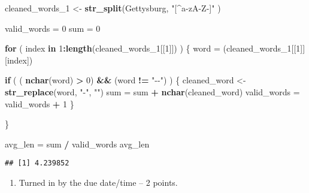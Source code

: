 \documentclass[
]{article}
\newenvironment{Shaded}{\begin{snugshade}}{\end{snugshade}}
\newcommand{\ControlFlowTok}[1]{\textcolor[rgb]{0.13,0.29,0.53}{\textbf{#1}}}
\newcommand{\DecValTok}[1]{\textcolor[rgb]{0.00,0.00,0.81}{#1}}
\newcommand{\FunctionTok}[1]{\textcolor[rgb]{0.13,0.29,0.53}{\textbf{#1}}}
\newcommand{\NormalTok}[1]{#1}
\newcommand{\OtherTok}[1]{\textcolor[rgb]{0.56,0.35,0.01}{#1}}
\newcommand{\SpecialCharTok}[1]{\textcolor[rgb]{0.81,0.36,0.00}{\textbf{#1}}}
\newcommand{\StringTok}[1]{\textcolor[rgb]{0.31,0.60,0.02}{#1}}
\providecommand{\tightlist}{%
  \setlength{\itemsep}{0pt}\setlength{\parskip}{0pt}}
\begin{document}
\begin{Shaded}
\begin{Highlighting}[]
\NormalTok{cleaned\_words\_1 }\OtherTok{\textless{}{-}} \FunctionTok{str\_split}\NormalTok{(Gettysburg, }\StringTok{"[\^{}a{-}zA{-}Z{-}]"}\NormalTok{   )}

\NormalTok{valid\_words }\OtherTok{=} \DecValTok{0}
\NormalTok{sum }\OtherTok{=} \DecValTok{0}

\ControlFlowTok{for}\NormalTok{ ( index }\ControlFlowTok{in} \DecValTok{1}\SpecialCharTok{:}\FunctionTok{length}\NormalTok{(cleaned\_words\_1[[}\DecValTok{1}\NormalTok{]]) )}
\NormalTok{\{}
\NormalTok{  word }\OtherTok{=}\NormalTok{ (cleaned\_words\_1[[}\DecValTok{1}\NormalTok{]][index])}
  
  \ControlFlowTok{if}\NormalTok{ ( ( }\FunctionTok{nchar}\NormalTok{(word) }\SpecialCharTok{\textgreater{}} \DecValTok{0}\NormalTok{) }\SpecialCharTok{\&\&}\NormalTok{ (word }\SpecialCharTok{!=} \StringTok{"{-}{-}"}\NormalTok{) )}
\NormalTok{  \{}
\NormalTok{    cleaned\_word }\OtherTok{\textless{}{-}} \FunctionTok{str\_replace}\NormalTok{(word, }\StringTok{"{-}"}\NormalTok{, }\StringTok{""}\NormalTok{)}
\NormalTok{    sum }\OtherTok{=}\NormalTok{ sum }\SpecialCharTok{+} \FunctionTok{nchar}\NormalTok{(cleaned\_word)}
\NormalTok{    valid\_words }\OtherTok{=}\NormalTok{ valid\_words }\SpecialCharTok{+} \DecValTok{1}
\NormalTok{  \}}
  
\NormalTok{\}}

\NormalTok{avg\_len }\OtherTok{=}\NormalTok{ sum }\SpecialCharTok{/}\NormalTok{ valid\_words}
\NormalTok{avg\_len}
\end{Highlighting}
\end{Shaded}

\begin{verbatim}
## [1] 4.239852
\end{verbatim}

\begin{enumerate}
\def\labelenumi{(\arabic{enumi})}
\setcounter{enumi}{3}
\tightlist
\item
  Turned in by the due date/time -- 2 points.
\end{enumerate}
\end{document}
